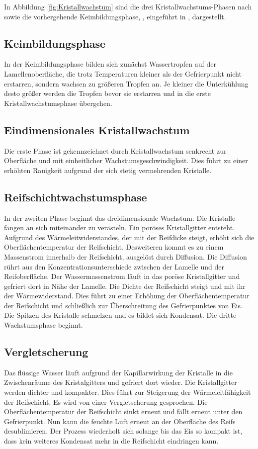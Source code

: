 In Abbildung \ref{fig:Kristallwachstum} sind die drei Kristallwachstums-Phasen nach \textsc{\citeauthor{Hayashi1977}} sowie die vorhergehende Keimbildungsphase, , eingeführt in \citep{Sahinagic2004}, dargestellt. 

\subsection*{Keimbildungsphase}

In der Keimbildungsphase bilden sich zunächst Wassertropfen auf der Lamellenoberfläche, die trotz Temperaturen kleiner als der Gefrierpunkt nicht erstarren, sondern wachsen zu größeren Tropfen an. Je kleiner die Unterkühlung desto größer werden die Tropfen bevor sie erstarren und in die erste Kristallwachstumsphase übergehen. 

\subsection*{Eindimensionales Kristallwachstum}
Die erste Phase ist gekennzeichnet durch Kristallwachstum senkrecht zur Oberfläche und mit einheitlicher Wachstumsgeschwindigkeit. Dies führt zu einer erhöhten Rauigkeit aufgrund der sich stetig vermehrenden Kristalle. 

\subsection*{Reifschichtwachstumsphase}
In der zweiten Phase beginnt das dreidimensionale Wachstum. Die Kristalle fangen an sich miteinander zu verästeln. Ein poröses Kristallgitter entsteht. Aufgrund des  Wärmeleitwiderstandes, der mit der Reifdicke steigt, erhöht sich die Oberflächentemperatur der Reifschicht. Desweiteren kommt es zu einem Massenstrom innerhalb der Reifschicht, ausgelöst durch Diffusion. Die Diffusion rührt aus  den  Konzentrationsunterschiede zwischen der Lamelle und der Reifoberfläche. Der Wassermassenstrom läuft in das poröse Kristallgitter und gefriert dort in Nähe der Lamelle. Die Dichte der Reifschicht steigt und mit ihr der Wärmewiderstand. Dies führt zu einer Erhöhung der Oberflächentemperatur der Reifschicht und schließlich zur Überschreitung des Gefrierpunktes von Eis. Die Spitzen des Kristalle schmelzen und es bildet sich Kondensat. Die dritte Wachstumsphase beginnt. 

\subsection*{Vergletscherung}

Das flüssige Wasser läuft aufgrund der Kapillarwirkung der Kristalle in die Zwischenräume des Kristalgitters und gefriert dort wieder. Die Kristallgitter werden dichter und kompakter. Dies führt zur Steigerung der Wärmeleitfähigkeit der Reifschicht. Es wird von einer Vergletscherung gesprochen. Die Oberflächentemperatur der Reifschicht sinkt erneut und fällt erneut unter den Gefrierpunkt. Nun kann die feuchte Luft erneut an der Oberfläche des Reifs desublimieren. Der Prozess wiederholt sich solange bis das Eis so kompakt ist, dass kein weiteres Kondensat mehr in die Reifschicht eindringen kann. 
    



